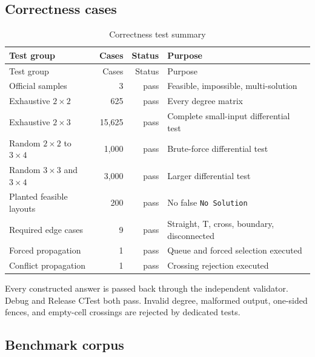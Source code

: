 \documentclass[11pt,a4paper]{article}
\begin{document}
\subsection{Correctness cases}

\begin{longtable}{>{\raggedright\arraybackslash}p{5.2cm}rr>{\raggedright\arraybackslash}p{5.7cm}}
\caption{Correctness test summary}\\
\toprule
Test group & Cases & Status & Purpose \\
\midrule
\endfirsthead
\toprule
Test group & Cases & Status & Purpose \\
\midrule
\endhead
Official samples & 3 & pass & Feasible, impossible, multi-solution \\
Exhaustive $2\times2$ & 625 & pass & Every degree matrix \\
Exhaustive $2\times3$ & 15,625 & pass & Complete small-input differential test \\
Random $2\times2$ to $3\times4$ & 1,000 & pass & Brute-force differential test \\
Random $3\times3$ and $3\times4$ & 3,000 & pass & Larger differential test \\
Planted feasible layouts & 200 & pass & No false \texttt{No Solution} \\
Required edge cases & 9 & pass & Straight, T, cross, boundary, disconnected \\
Forced propagation & 1 & pass & Queue and forced selection executed \\
Conflict propagation & 1 & pass & Crossing rejection executed \\
\bottomrule
\end{longtable}

Every constructed answer is passed back through the independent validator.
Debug and Release CTest both pass. Invalid degree, malformed output, one-sided
fences, and empty-cell crossings are rejected by dedicated tests.

\clearpage
\subsection{Benchmark corpus}
\end{document}
